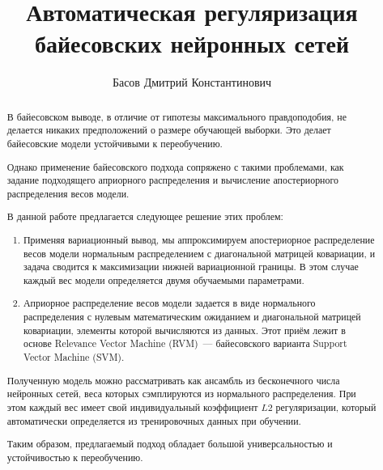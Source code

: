 \documentclass{article}
\title{Автоматическая регуляризация байесовских нейронных сетей}
\author{
    Басов Дмитрий Константинович
}
\date{}
\numberwithin{equation}{section}
\begin{document}
    \maketitle

    \begin{abstract}
        В байесовском выводе, в отличие от гипотезы максимального правдоподобия,
        не делается никаких предположений о размере обучающей выборки.
        Это делает байесовские модели устойчивыми к переобучению.

        Однако применение байесовского подхода сопряжено с такими проблемами,
        как задание подходящего априорного распределения и вычисление апостериорного распределения весов модели.

        В данной работе предлагается следующее решение этих проблем:
        \begin{enumerate}
            \item Применяя вариационный вывод,
                мы аппроксимируем апостериорное распределение весов модели
                нормальным распределением с диагональной матрицей ковариации,
                и задача сводится к максимизации нижней вариационной границы.
                В этом случае каждый вес модели определяется двумя обучаемыми параметрами.
            \item Априорное распределение весов модели задается в виде
                нормального распределения с нулевым математическим ожиданием
                и диагональной матрицей ковариации, элементы которой вычисляются из данных.
                Этот приём лежит в основе Relevance Vector Machine (RVM)~--- байесовского варианта Support Vector Machine (SVM).
        \end{enumerate}

        Полученную модель можно рассматривать как
        ансамбль из бесконечного числа нейронных сетей,
        веса которых сэмплируются из нормального распределения.
        При этом каждый вес имеет свой индивидуальный коэффициент $L2$ регуляризации,
        который автоматически определяется из тренировочных данных при обучении.

        Таким образом, предлагаемый подход обладает большой универсальностью и устойчивостью к переобучению.

    \end{abstract}
\end{document}
